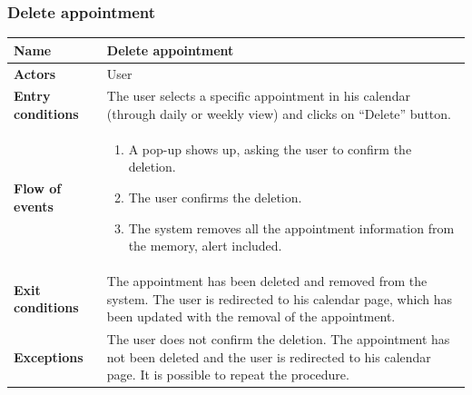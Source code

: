 \subsubsection{Delete appointment}
\begin{table}[!h]
	\centering
	{\renewcommand{\arraystretch}{2}%
		\begin{tabular}{|l|p{12cm}|}
			\hline
			\textbf{Name} 				& \textbf{Delete appointment} \\ \hline
			\textbf{Actors} 			& User \\ \hline
			\textbf{Entry conditions} 	& The user selects a specific appointment in his calendar (through daily or weekly view) and clicks on “Delete” button. \\ \hline
			\textbf{Flow of events}		& \begin{minipage}[t]{0.75\textwidth}
				\begin{enumerate}
					\item A pop-up shows up, asking the user to confirm the deletion.
					\item The user confirms the deletion.
					\item The system removes all the appointment information from the memory, alert included.
				\end{enumerate}
			\end{minipage}	\\ \hline
			\textbf{Exit conditions}	& The appointment has been deleted and removed from the system. The user is redirected to his calendar page, which has been updated with the removal of the appointment.  \\ \hline
			\textbf{Exceptions}			& The user does not confirm the deletion. The appointment has not been deleted and the user is redirected to his calendar page. It is possible to repeat the procedure.  \\ \hline
	\end{tabular}}
\end{table}
\clearpage

